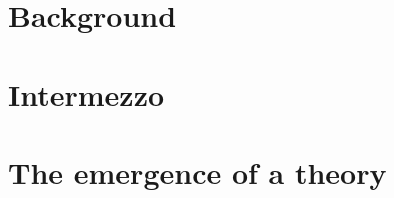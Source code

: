 \documentclass[ twoside, openright,titlepage,numbers=noenddot,headinclude,footinclude,cleardoublepage=empty,abstract=on, BCOR=5mm,paper=a4,fontsize=11pt, dvipsnames ]{scrreprt}
\begin{document}
\frenchspacing \raggedbottom {}

\pagestyle{plain}




% 



\cleardoublepage


\pagestyle{scrheadings}


\cleardoublepage \part{Background}\label{pt:background}





\cleardoublepage \part{Intermezzo}\label{pt:intermezzo}




\cleardoublepage \part{The emergence of a theory}\label{pt:emergence_of_theory}




\appendix

\renewcommand{\thechapter}{\Alph{chapter}}
\cleardoublepage
\end{document}
